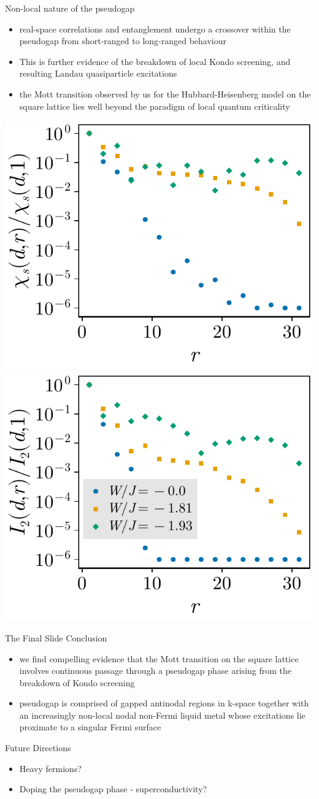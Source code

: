 \documentclass[10pt,aspectratio=169]{beamer}
\begin{document}
\begin{frame}{Non-local nature of the pseudogap}
	\begin{itemize}
		\item real-space correlations and entanglement undergo a crossover within the pseudogap from short-ranged to \alert{long-ranged} behaviour
		\item This is further evidence of the \alert{breakdown of local Kondo screening}, and resulting Landau quasiparticle excitations
		\item the Mott transition observed by us for the Hubbard-Heisenberg model on the square lattice lies well beyond the paradigm of \alert{local quantum criticality}
	\end{itemize}

\begin{center}
    \includegraphics[width=0.35\linewidth]{SF-di_69-2000.pdf}
    \includegraphics[width=0.35\linewidth]{I2-di_69-2000.pdf}
\end{center}
\end{frame}

\begin{frame}{The Final Slide}
	\alert{Conclusion}
	\begin{itemize}
		\item  we find compelling evidence that the Mott transition on the square lattice involves continuous passage through a pseudogap phase arising from the breakdown of Kondo screening
		\item pseudogap is comprised of gapped antinodal regions in k-space together with an increasingly non-local nodal non-Fermi liquid metal whose excitations lie proximate to a singular Fermi surface
	\end{itemize}

	\alert{Future Directions}
\begin{itemize}
	\item Heavy fermions?
	\item Doping the pseudogap phase - superconductivity?
\end{itemize}

\end{frame}
\end{document}
